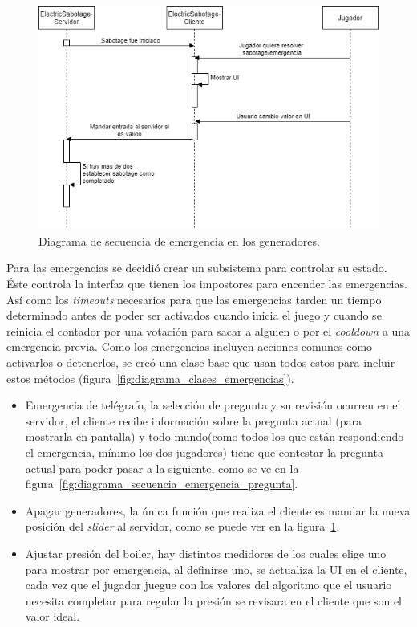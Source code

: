         \begin{figure}[p]
            \centering
            \includegraphics[width=1\linewidth]{images/DiagramaSecuenciaSabotageGeneradores.png}
            \caption{Diagrama de secuencia de emergencia en los generadores.}
            \label{fig:diagrama_secuencia_generadores}
        \end{figure}
Para las emergencias se decidió crear un subsistema para controlar su estado. Éste controla la interfaz que tienen los impostores para encender las emergencias. Así como los \textit{timeouts} necesarios para que las emergencias tarden un tiempo determinado antes de poder ser activados cuando inicia el juego y cuando se reinicia el contador por una votación para sacar a alguien o por el \textit{cooldown} a una emergencia previa.
Como los emergencias incluyen acciones comunes como activarlos o detenerlos, se creó una clase base que usan todos estos para incluir estos métodos (figura~\ref{fig:diagrama_clases_emergencias}).
\begin{itemize}
    \item Emergencia de telégrafo, la selección de pregunta y su revisión ocurren en el servidor, el cliente recibe información sobre la pregunta actual (para mostrarla en pantalla) y todo mundo(como todos los que están respondiendo el emergencia, mínimo los dos jugadores) tiene que contestar la pregunta actual para poder pasar a la siguiente, como se ve en la figura~\ref{fig:diagrama_secuencia_emergencia_pregunta}.
    \item Apagar generadores, la única función que realiza el cliente es mandar la nueva posición del \textit{slider} al servidor, como se puede ver en la figura~\ref{fig:diagrama_secuencia_generadores}.
    \item Ajustar presión del boiler, hay distintos medidores de los cuales elige uno para mostrar por emergencia, al definirse uno, se actualiza la UI en el cliente, cada vez que el jugador juegue con los valores del algoritmo que el usuario necesita completar para regular la presión se revisara en el cliente que son el valor ideal.
\end{itemize}

